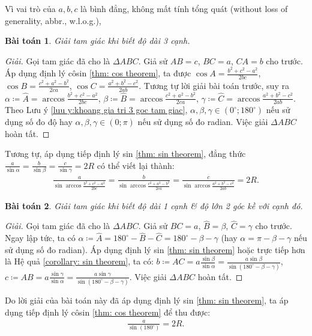 \documentclass[oneside]{book}
\numberwithin{equation}{section}
\newtheorem{baitoan}{Bài toán}[section]
\begin{document}
Vì vai trò của $a,b,c$ là bình đẳng, không mất tính tổng quát (without loss of generality, abbr., w.l.o.g.), 

\begin{baitoan}
	Giải tam giác khi biết độ dài 3 cạnh.
\end{baitoan}

\begin{proof}[Giải]
	Gọi tam giác đã cho là $\Delta ABC$. Giả sử $AB = c$, $BC = a$, $CA = b$ cho trước. Áp dụng định lý côsin \ref{thm: cos theorem}, ta được $\cos A = \frac{b^2 + c^2 - a^2}{2bc}$, $\cos B = \frac{c^2 + a^2 - b^2}{2ca}$, $\cos C = \frac{a^2 + b^2 - c^2}{2ab}$. Tương tự lời giải bài toán trước, suy ra $\alpha\coloneqq\widehat{A} = \arccos\frac{b^2 + c^2 - a^2}{2bc}$, $\beta\coloneqq\widehat{B} = \arccos\frac{c^2 + a^2 - b^2}{2ca}$, $\gamma\coloneqq\widehat{C} = \arccos\frac{a^2 + b^2 - c^2}{2ab}$. Theo Lưu ý \ref{luu y:khoang gia tri 3 goc tam giac}, $\alpha,\beta,\gamma\in(0^\circ;180^\circ)$ nếu sử dụng số đo độ hay $\alpha,\beta,\gamma\in(0;\pi)$ nếu sử dụng số đo radian. Việc giải $\Delta ABC$ hoàn tất.
\end{proof}
Tương tự, áp dụng tiếp định lý sin \ref{thm: sin theorem}, đẳng thức $\frac{a}{\sin\alpha} = \frac{b}{\sin\beta} = \frac{c}{\sin\gamma} = 2R$ có thể viết lại thành:
\begin{align*}
	\frac{a}{\sin\arccos\frac{b^2 + c^2 - a^2}{2bc}} = \frac{b}{\sin\arccos\frac{c^2 + a^2 - b^2}{2ca}} = \frac{c}{\sin\arccos\frac{a^2 + b^2 - c^2}{2ab}} = 2R.
\end{align*}

\begin{baitoan}
	Giải tam giác khi biết độ dài 1 cạnh \& độ lớn 2 góc kề với cạnh đó.
\end{baitoan}

\begin{proof}[Giải]
	Gọi tam giác đã cho là $\Delta ABC$. Giả sử $BC = a$, $\widehat{B} = \beta$, $\widehat{C} = \gamma$ cho trước. Ngay lập tức, ta có $\alpha\coloneqq\widehat{A} = 180^\circ - \widehat{B} - \widehat{C} = 180^\circ - \beta - \gamma$ (hay $\alpha = \pi - \beta - \gamma$ nếu sử dụng số đo radian). Áp dụng định lý sin \ref{thm: sin theorem} hoặc trực tiếp hơn là Hệ quả \ref{corollary: sin theorem}, ta có: $b\coloneqq AC = a\frac{\sin\beta}{\sin\alpha} = \frac{a\sin\beta}{\sin(180^\circ - \beta - \gamma)}$, $c\coloneqq AB = a\frac{\sin\gamma}{\sin\alpha} = \frac{a\sin\gamma}{\sin(180^\circ - \beta - \gamma)}$. Việc giải $\Delta ABC$ hoàn tất.
\end{proof}
Do lời giải của bài toán này đã áp dụng định lý sin \ref{thm: sin theorem}, ta áp dụng tiếp định lý côsin \ref{thm: cos theorem} để thu được:
\begin{align*}
	\frac{a}{\sin(180^\circ)} = 2R.
\end{align*}
\end{document}
